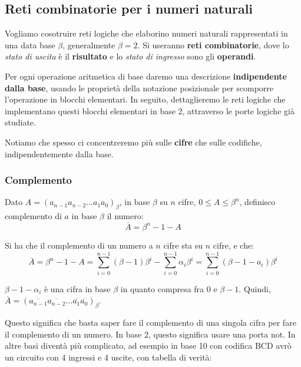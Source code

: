 \documentclass[a4paper,11pt]{article}
\begin{document}
\subsection{Reti combinatorie per i numeri naturali}
Vogliamo cosotruire reti logiche che elaborino numeri naturali rappresentati in una data base $\beta$, generalmente $\beta = 2$.
Si useranno \textbf{reti combinatorie}, dove lo \textit{stato di uscita} è il \textbf{risultato} e lo \textit{stato di ingresso} sono gli \textbf{operandi}.

Per ogni operazione aritmetica di base daremo una descrizione \textbf{indipendente dalla base}, usando le proprietà della notazione posizionale per scomporre l'operazione in blocchi elementari.
In seguito, dettaglieremo le reti logiche che implementano questi blocchi elementari in base 2, attraverso le porte logiche già studiate.

Notiamo che spesso ci concentreremo più sulle \textbf{cifre} che sulle codifiche, indipendentemente dalla base.

\subsubsection{Complemento}
Dato $A = (a_{n-1} a_{n-2} ... a_1 a_0)_\beta$, in base $\beta$ su $n$ cifre, $0 \leq A \leq \beta^n$, definisco complemento di $a$ in base $\beta$ il numero:
$$
\overline{A} = \beta^n - 1 - A
$$

Si ha che il complemento di un numero a $n$ cifre sta su $n$ cifre,  e che:
$$
\overline{A} = \beta^n - 1 - A = \sum_{i=0}^{n-1} (\beta - 1) \beta^i - \sum_{i=0}^{n-1} \alpha_i \beta^i = \sum_{i = 0}^{n-1} (\beta - 1 - a_i)\beta^i
$$

$\beta - 1 -\alpha_i$ è una cifra in base $\beta$ in quanto compresa fra $0$ e $\beta - 1$.
Quindi, $\overline{A} = (\overline{a_{n-1}} \overline{a_{n-2}} ... \overline{a_{1}} \overline{a_{0}})_\beta$.

Questo significa che basta saper fare il complemento di una singola cifra per fare il complemento di un numero.
In base 2, questo significa usare una porta not.
In altre basi diventà più complicato, ad esempio in base 10 con codifica BCD avrò un circuito con 4 ingressi e 4 uscite, con tabella di verità:
\end{document}
